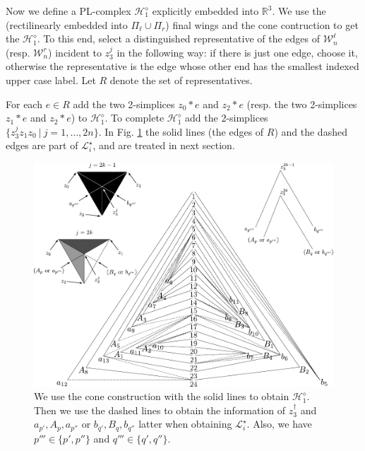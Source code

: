 
Now we define a PL-complex $\mathcal{H}^\diamond_1$ explicitly embedded into $\mathbb{R}^3$. 
We use the (rectilinearly embedded into $\Pi_\ell \cup \Pi_r$) 
final wings and the cone contruction to get the 
$\mathcal{H}^\diamond_1$. To this end, select a distinguished representative 
of the edges of $\mathcal{W}_n^\ell$ (resp. $\mathcal{W}_n^r$) incident to $z_3^j$ in the following way: if there is just one edge, choose it, 
otherwise the representative is the edge whose other end has the smallest indexed upper case label.
Let $R$ denote the set of representatives.

For each $e \in R$ 
add the two 2-simplices $z_0\ast e$ and $z_2\ast e$ (resp. the two 2-simplices 
$z_1\ast e$ and $z_2\ast e$) to  $\mathcal{H}^\diamond_1$.  
To complete 
$\mathcal{H}^\diamond_1$ add the 
2-simplices $\{z_3^jz_1z_0 \ | \ j=1,\ldots,2n\}$.
In Fig. \ref{fig:U} the solid lines
  (the edges of $R$) and the dashed edges are part of $\mathcal{L}^\star_i$,
and are treated in next section.

\begin{figure}[!htb]
\begin{center}
\includegraphics[width=15cm]{A.figs/U.pdf}
\caption{We use the cone construction with the solid lines to obtain $\mathcal{H}_1^\diamond.$ 
Then we use the dashed lines
to obtain the information of $z_3^\dagger$ and $a_{p'}, A_p, a_{p''}$ or $b_{q'}, B_q, b_{q''}$ 
latter when obtaining $\mathcal{L}_i^\star$. Also, we have $p'''\in\{p' ,p''\}$ and  $q'''\in\{q' ,q''\}$.} 
\label{fig:U}
\end{center}
\end{figure}

